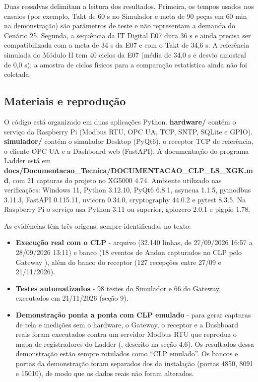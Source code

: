 Duas ressalvas delimitam a leitura dos resultados. Primeira, os tempos usados nos ensaios (por exemplo, Takt de 60 s no Simulador e meta de 90 peças em 60 min na demonstração) são parâmetros de teste e não representam a demanda do Cenário 25. Segunda, a sequência da IT Digital E07 dura 36 s e ainda precisa ser compatibilizada com a meta de 34 s da E07 e com o Takt de 34,6 s. A referência simulada do Módulo II tem 40 ciclos da E07 (média de 34,0 s e desvio amostral de 0,0 s); a amostra de ciclos físicos para a comparação estatística ainda não foi coletada.

\subsection{Materiais e reprodução}\label{sec:materiais}

O código está organizado em duas aplicações Python. \textbf{hardware/} contém o serviço da Raspberry Pi (Modbus RTU, OPC UA, TCP, SNTP, SQLite e GPIO). \textbf{simulador/} contém o simulador Desktop (PyQt6), o receptor TCP de referência, o cliente OPC UA e a Dashboard web (FastAPI). A documentação do programa Ladder está em \textbf{docs/Documentacao\_Tecnica/DOCUMENTACAO\_CLP\_LS\_XGK.md}, com 21 capturas do projeto  no XG5000 4.74. Ambiente utilizado nas verificações: Windows 11, Python 3.12.10, PyQt6 6.8.1, asyncua 1.1.5, pymodbus 3.11.3, FastAPI 0.115.11, uvicorn 0.34.0, cryptography 44.0.2 e pytest 8.3.5. Na Raspberry Pi o serviço usa Python 3.11 ou superior, gpiozero 2.0.1 e pigpio 1.78.

As evidências têm três origens, sempre identificadas no texto:

\begin{itemize}
    \item \textbf{Execução real com o CLP} - arquivo  (32.140 linhas, de 27/09/2026 16:57 a 28/09/2026 13:11) e banco  (18 eventos de Andon capturados no CLP pelo Gateway ), além do banco do receptor  (127 recepções entre 27/09 e 21/11/2026).
    \item \textbf{Testes automatizados} - 98 testes do Simulador e 66 do Gateway, executados em 21/11/2026 (seção 9).
    \item \textbf{Demonstração ponta a ponta com CLP emulado} - para gerar capturas de tela e medições sem o hardware, o Gateway, o receptor e a Dashboard reais foram executados contra um servidor Modbus RTU que reproduz o mapa de registradores do Ladder (, descrito na seção 4.6). Os resultados dessa demonstração estão sempre rotulados como ``CLP emulado''. Os bancos e portas da demonstração foram separados dos da instalação (portas 4850, 8091 e 15010), de modo que os dados reais não foram alterados.
\end{itemize}

